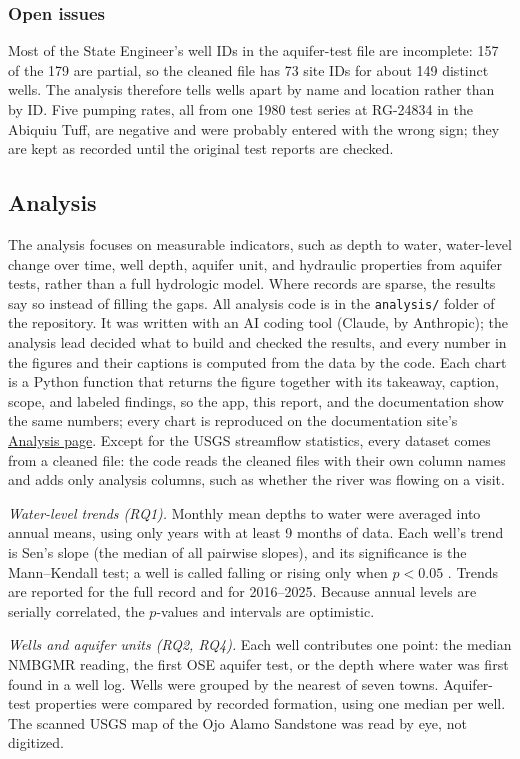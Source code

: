 \documentclass[10pt,twocolumn,letterpaper]{article}
\begin{document}
\subsubsection{Open issues}
Most of the State Engineer's well IDs in the aquifer-test file are incomplete: 157 of the 179 are
partial, so the cleaned file has 73 site IDs for about 149 distinct wells. The analysis therefore
tells wells apart by name and location rather than by ID. Five pumping rates, all from one 1980
test series at RG-24834 in the Abiquiu Tuff, are negative and were probably entered with the wrong
sign; they are kept as recorded until the original test reports are checked.

\subsection{Analysis}
The analysis focuses on measurable indicators, such as depth to water, water-level change over
time, well depth, aquifer unit, and hydraulic properties from aquifer tests, rather than a full
hydrologic model. Where records
are sparse, the results say so instead of filling the gaps.
All analysis code is in the \texttt{analysis/} folder of the repository. It was written with an AI
coding tool (Claude, by Anthropic); the analysis lead decided what to build and checked the results,
and every number in the figures and their captions is computed from the data by the code. Each chart is a Python
function that returns the figure together with its takeaway, caption, scope, and labeled findings,
so the app, this report, and the documentation show the same numbers; every chart is reproduced on
the documentation site's \href{https://pdjordj11.github.io/eng_220_aquifer_project/analysis/}{Analysis page}. Except for the USGS streamflow
statistics, every dataset comes from a cleaned file: the code reads the cleaned files with their own
column names and adds only analysis columns, such as whether the river was flowing on a visit.

\emph{Water-level trends (RQ1).} Monthly mean depths to water were averaged into annual means,
using only years with at least 9 months of data. Each well's trend is Sen's slope (the median of all
pairwise slopes), and its significance is the Mann--Kendall test; a well is called falling or rising
only when $p<0.05$ \citep{helsel2020}. Trends are reported for the full record and for 2016--2025.
Because annual levels are serially correlated, the $p$-values and intervals are optimistic.

\emph{Wells and aquifer units (RQ2, RQ4).} Each well contributes one point: the median NMBGMR
reading, the first OSE aquifer test, or the depth where water was first found in a well log. Wells
were grouped by the nearest of seven towns. Aquifer-test properties were compared by recorded
formation, using one median per well. The scanned USGS map of the Ojo Alamo Sandstone
\citep{thorn1990} was read by eye, not digitized.
\end{document}
